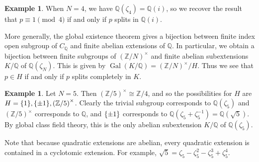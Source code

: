 \documentclass[leqno, openany]{memoir}
\theoremstyle{definition}
\newtheorem{exm}[thm]{Example}
\theoremstyle{remark}
\theoremstyle{plain}
\theoremstyle{definition}
\theoremstyle{remark}
\newcommand{\Z}{\mathbb{Z}}
\newcommand{\Q}{\mathbb{Q}}
\DeclareMathOperator{\Gal}{Gal}
\begin{document}
\begin{exm} When $N=4$, we have $\Q(\zeta_4) = \Q(i)$, so we recover the result
that $p \equiv 1 \pmod 4$ if and only if $p$ splits in $\Q(i)$.  \end{exm}

More generally, the global existence theorem gives a bijection between finite
index open subgroup of $C_{\Q}$ and finite abelian extensions of $\Q$. In
particular, we obtain a bijection between finite subgroups of
${(\Z/N)}^{\times}$ and finite abelian subextensions $K/\Q$ of $\Q(\zeta_N)$.
This is given by $\Gal(K/\Q) = {(\Z/N)}^{\times} / H$. Thus we see that $p \in
H$ if and only if $p$ splits completely in $K$.

\begin{exm} Let $N = 5$. Then ${( \Z/5 )}^{\times} \cong \Z/4$, and so the
    possibilities for $H$ are $H = \qty{1}, \qty{\pm 1}, {(\Z/5)}^{\times}$.
    Clearly the trivial subgroup corresponds to $\Q(\zeta_5)$ and
    ${(\Z/5)}^{\times}$ corresponds to $\Q$, and $\qty{\pm 1}$ corresponds to
    $\Q(\zeta_5 + \zeta_5^{-1}) = \Q(\sqrt{5})$. By global class field theory,
    this is the only abelian subextension $K/\Q$ of $\Q(\zeta_5)$.  \end{exm}

Note that because quadratic extensions are abelian, every quadratic extension
is contained in a cyclotomic extension. For example, $\sqrt{5} = \zeta_5 -
\zeta_5^2 - \zeta_5^3 + \zeta_5^4$.
\end{document}
